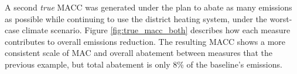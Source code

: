 \documentclass[twocolumn, a4paper,10pt]{article}
\begin{document}
A second \textit{true} MACC was generated under the plan to abate as many emissions as possible while continuing to use the district heating system, under the worst-case climate scenario. Figure \ref{fig:true_macc_both} describes how each measure contributes to overall emissions reduction. The resulting MACC shows a more consistent scale of MAC and overall abatement between measures that the previous example, but total abatement is only 8\% of the baseline's emissions.





\end{document}

